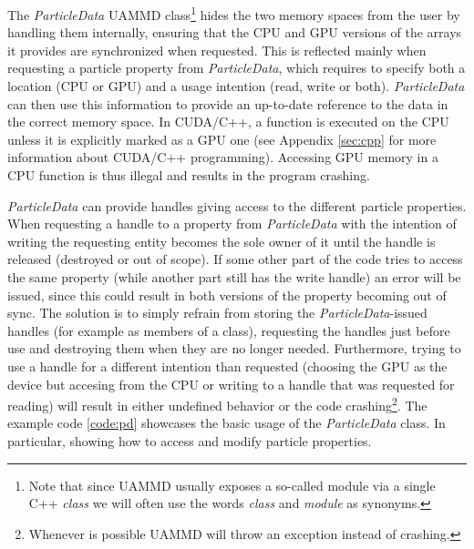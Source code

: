 \documentclass[ twoside,openright,titlepage,numbers=noenddot,%
headinclude,footinclude,cleardoublepage=empty,abstract=on,
BCOR=5mm,paper=b5,fontsize=11pt, dvipsnames
]{scrreprt}
\newcommand{\uammd}{\gls{UAMMD}\xspace}
\newcommand{\gpu}{\gls{GPU}\xspace}
\begin{document}
The \emph{ParticleData} \uammd class\footnote{Note that since \uammd usually exposes a so-called module via a single C++ \emph{class} we will often use the words \emph{class} and \emph{module} as synonyms.} hides the two memory spaces from the user by handling them internally, ensuring that the CPU and \gpu versions of the arrays it provides are synchronized when requested. This is reflected mainly when requesting a particle property from \emph{ParticleData}, which requires to specify both a location (CPU or \gpu) and a usage intention (read, write or both). \emph{ParticleData} can then use this information to provide an up-to-date reference to the data in the correct memory space.
In CUDA/C++, a function is executed on the CPU unless it is explicitly marked as a \gpu one (see Appendix \ref{sec:cpp} for more information about CUDA/C++ programming). Accessing \gpu memory in a CPU function is thus illegal and results in the program crashing.

\emph{ParticleData} can provide handles giving access to the different particle properties.
When requesting a handle to a property from \emph{ParticleData} with the intention of writing the requesting entity becomes the sole owner of it until the handle is released (destroyed or out of scope). If some other part of the code tries to access the same property (while another part still has the write handle) an error will be issued, since this could result in both versions of the property becoming out of sync. The solution is to simply refrain from storing the \emph{ParticleData}-issued handles (for example as members of a class), requesting the handles just before use and destroying them when they are no longer needed. Furthermore, trying to use a handle for a different intention than requested (choosing the GPU as the device but accesing from the CPU or writing to a handle that was requested for reading) will result in either undefined behavior or the code crashing\footnote{Whenever is possible \uammd will throw an exception instead of crashing.}. The example code \ref{code:pd} showcases the basic usage of the \emph{ParticleData} class. In particular, showing how to access and modify particle properties.
\end{document}
